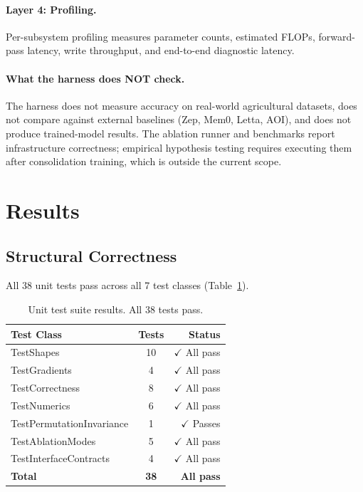 \documentclass{article}
\begin{document}
\paragraph{Layer 4: Profiling.}
Per-subsystem profiling measures parameter counts, estimated FLOPs, forward-pass
latency, write throughput, and end-to-end diagnostic latency.

\paragraph{What the harness does NOT check.}
The harness does not measure accuracy on real-world agricultural datasets, does not
compare against external baselines (Zep, Mem0, Letta, AOI), and does not produce
trained-model results. The ablation runner and benchmarks report infrastructure
correctness; empirical hypothesis testing requires executing them after
consolidation training, which is outside the current scope.

\section{Results}
\label{sec:results}

\subsection{Structural Correctness}

All 38 unit tests pass across all 7 test classes (Table~\ref{tab:tests}).

\begin{table}[h]
\centering
\caption{Unit test suite results. All 38 tests pass.}
\label{tab:tests}
\begin{tabular}{lcr}
\toprule
\textbf{Test Class} & \textbf{Tests} & \textbf{Status} \\
\midrule
TestShapes & 10 & $\checkmark$ All pass \\
TestGradients & 4 & $\checkmark$ All pass \\
TestCorrectness & 8 & $\checkmark$ All pass \\
TestNumerics & 6 & $\checkmark$ All pass \\
TestPermutationInvariance & 1 & $\checkmark$ Passes \\
TestAblationModes & 5 & $\checkmark$ All pass \\
TestInterfaceContracts & 4 & $\checkmark$ All pass \\
\midrule
\textbf{Total} & \textbf{38} & \textbf{All pass} \\
\bottomrule
\end{tabular}
\end{table}
\end{document}
